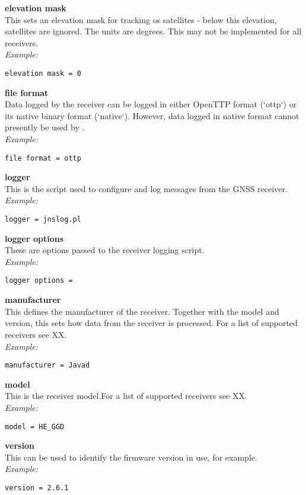 {\bfseries elevation mask}\\
This sets an elevation mask for tracking os satellites - below this elevation, satellites
are ignored. The units are degrees. This may not be implemented for all receivers.\\
\textit{Example:}
\begin{lstlisting}
elevation mask = 0
\end{lstlisting}

{\bfseries file format}\\
Data logged by the receiver can be logged in either OpenTTP format (`ottp`) or its native binary format (`native`).
However, data logged in native format cannot presently be used by .\\
\textit{Example:}
\begin{lstlisting}
file format = ottp
\end{lstlisting}

{\bfseries logger}\\
This is the script used to configure and log messages from the GNSS receiver.\\
\textit{Example:}
\begin{lstlisting}
logger = jnslog.pl
\end{lstlisting}

{\bfseries logger options}\\
These are options passed to the receiver logging script.\\
\textit{Example:}
\begin{lstlisting}
logger options =
\end{lstlisting}

{\bfseries manufacturer}\\
This defines the manufacturer of the receiver. Together with the model and version, 
this sets how data from the receiver is processed. For a list of supported receivers
see XX.\\
\textit{Example:}
\begin{lstlisting}
manufacturer = Javad
\end{lstlisting}

{\bfseries model}\\
This is the receiver model.For a list of supported receivers
see XX.\\
\textit{Example:}
\begin{lstlisting}
model = HE_GGD
\end{lstlisting}

{\bfseries version}\\
This can be used to identify the firmware version in use, for example.\\
\textit{Example:}
\begin{lstlisting}
version = 2.6.1
\end{lstlisting}

